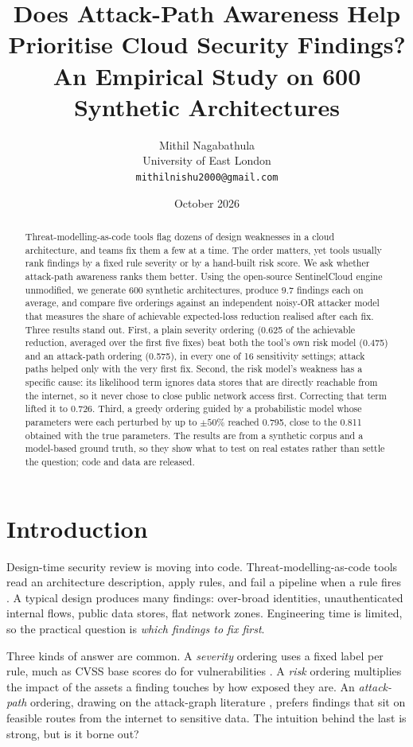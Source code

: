\documentclass[11pt]{article}
\title{Does Attack-Path Awareness Help Prioritise Cloud Security Findings?\\
\large An Empirical Study on 600 Synthetic Architectures}
\author{Mithil Nagabathula\\University of East London\\\texttt{mithilnishu2000@gmail.com}}
\date{October 2026}
\begin{document}
\maketitle

\begin{abstract}
Threat-modelling-as-code tools flag dozens of design weaknesses in a cloud architecture, and teams fix them a few at a time.
The order matters, yet tools usually rank findings by a fixed rule severity or by a hand-built risk score.
We ask whether attack-path awareness ranks them better.
Using the open-source SentinelCloud engine unmodified, we generate 600 synthetic architectures, produce \(9.7\) findings each on average,
and compare five orderings against an independent noisy-OR attacker model that measures the share of achievable expected-loss reduction
realised after each fix.
Three results stand out.
First, a plain severity ordering (0.625 of the achievable reduction, averaged over the first five fixes) beat both the tool's own risk model (0.475)
and an attack-path ordering (0.575), in every one of 16 sensitivity settings; attack paths helped only with the very first fix.
Second, the risk model's weakness has a specific cause: its likelihood term ignores data stores that are directly reachable from the internet,
so it never chose to close public network access first. Correcting that term lifted it to 0.726.
Third, a greedy ordering guided by a probabilistic model whose parameters were each perturbed by up to \(\pm50\%\) reached 0.795, close to the
0.811 obtained with the true parameters.
The results are from a synthetic corpus and a model-based ground truth, so they show what to test on real estates rather than settle the question;
code and data are released.
\end{abstract}

\section{Introduction}
Design-time security review is moving into code. Threat-modelling-as-code tools read an architecture description, apply rules,
and fail a pipeline when a rule fires \cite{shostack2014threat}. A typical design produces many findings: over-broad identities,
unauthenticated internal flows, public data stores, flat network zones. Engineering time is limited, so the practical question is
\emph{which findings to fix first}.

Three kinds of answer are common. A \emph{severity} ordering uses a fixed label per rule, much as CVSS base scores do for vulnerabilities
\cite{first2019cvss}. A \emph{risk} ordering multiplies the impact of the assets a finding touches by how exposed they are.
An \emph{attack-path} ordering, drawing on the attack-graph literature \cite{sheyner2002attackgraphs,ou2005mulval}, prefers findings that
sit on feasible routes from the internet to sensitive data. The intuition behind the last is strong, but is it borne out?
\end{document}
